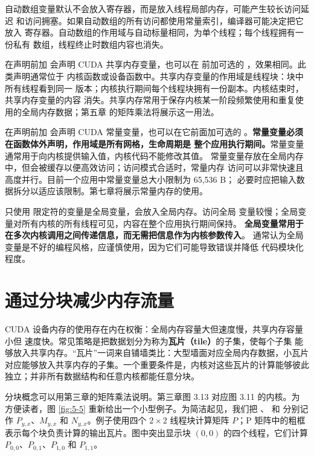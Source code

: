 自动数组变量默认不会放入寄存器，而是放入线程局部内存，可能产生较长访问延迟
和访问拥塞。如果自动数组的所有访问都使用常量索引，编译器可能决定把它放入
寄存器。自动数组的作用域与自动标量相同，为单个线程；每个线程拥有一份私有
数组，线程终止时数组内容也消失。

在声明前加  会声明 CUDA 共享内存变量，也可以在
 前加可选的 ，效果相同。此类声明通常位于
内核函数或设备函数中。共享内存变量的作用域是线程块：块中所有线程看到同一
版本；内核执行期间每个线程块拥有一份副本。内核结束时，共享内存变量的内容
消失。共享内存常用于保存内核某一阶段频繁使用和重复使用的全局内存数据；第五章
的矩阵乘法将展示这一用法。

在声明前加  会声明 CUDA 常量变量，也可以在它前面加可选的
。\textbf{常量变量必须在函数体外声明，作用域是所有网格，生命周期是
整个应用执行期间。}常量变量通常用于向内核提供输入值，内核代码不能修改其值。
常量变量存放在全局内存中，但会被缓存以便高效访问；访问模式合适时，常量内存
访问可以非常快速且高度并行。目前一个应用中常量变量总大小限制为 65,536 B；
必要时应把输入数据拆分以适应该限制。第七章将展示常量内存的使用。

只使用  限定符的变量是全局变量，会放入全局内存。访问全局
变量较慢；全局变量对所有内核的所有线程可见，内容在整个应用执行期间保持。
\textbf{全局变量常用于在多次内核调用之间传递信息，而无需把信息作为内核参数传入}。
通常认为全局变量是不好的编程风格，应谨慎使用，因为它们可能导致错误并降低
代码模块化程度。

\section{通过分块减少内存流量}
\label{sec:tiling-reduced-memory-traffic}

CUDA 设备内存的使用存在内在权衡：全局内存容量大但速度慢，共享内存容量小但
速度快。常见策略是把数据划分为称为\textbf{瓦片（tile）}的子集，使每个子集
能够放入共享内存。“瓦片”一词来自铺墙类比：大型墙面对应全局内存数据，小瓦片
对应能够放入共享内存的子集。一个重要条件是，内核对这些瓦片的计算能够彼此
独立；并非所有数据结构和任意内核都能任意分块。

分块概念可以用第三章的矩阵乘法说明。第三章图 3.13 对应图 3.11 的内核。为
方便读者，图 \ref{fig:5-5} 重新给出一个小型例子。为简洁起见，我们把
、 和  分别记作
$P_{y,x}$、$M_{y,x}$ 和 $N_{y,x}$。例子使用四个 $2\times2$ 线程块计算矩阵
$P$；P 矩阵中的粗框表示每个块负责计算的输出瓦片。图中突出显示块 $(0,0)$
的四个线程，它们计算 $P_{0,0}$、$P_{0,1}$、$P_{1,0}$ 和 $P_{1,1}$。

